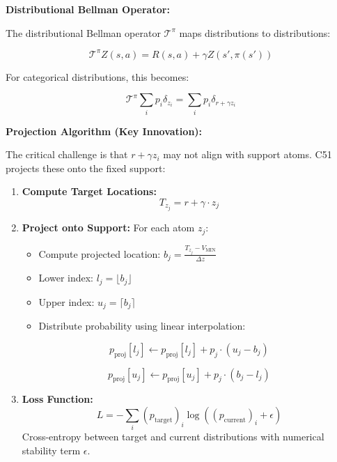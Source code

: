 \documentclass[12pt]{article}
\begin{document}
{{\textbf{Distributional Bellman Operator:}

The distributional Bellman operator $\mathcal{T}^\pi$ maps distributions to distributions:

\begin{equation}
\mathcal{T}^\pi Z(s,a) = R(s,a) + \gamma Z(s', \pi(s'))
\end{equation}

For categorical distributions, this becomes:

\begin{equation}
\mathcal{T}^\pi \sum_i p_i \delta_{z_i} = \sum_i p_i \delta_{r + \gamma z_i}
\end{equation}

\textbf{Projection Algorithm (Key Innovation):}

The critical challenge is that $r + \gamma z_i$ may not align with support atoms. C51 projects these onto the fixed support:

\begin{enumerate}
\item \textbf{Compute Target Locations:}
\begin{equation}
T_{z_j} = r + \gamma \cdot z_j
\end{equation}

\item \textbf{Project onto Support:}
For each atom $z_j$:
\begin{itemize}
\item Compute projected location: $b_j = \frac{T_{z_j} - V_{\text{MIN}}}{\Delta z}$
\item Lower index: $l_j = \lfloor b_j \rfloor$
\item Upper index: $u_j = \lceil b_j \rceil$
\item Distribute probability using linear interpolation:
\end{itemize}

\begin{equation}
p_{\text{proj}}[l_j] \leftarrow p_{\text{proj}}[l_j] + p_j \cdot (u_j - b_j)
\end{equation}

\begin{equation}
p_{\text{proj}}[u_j] \leftarrow p_{\text{proj}}[u_j] + p_j \cdot (b_j - l_j)
\end{equation}

\item \textbf{Loss Function:}
\begin{equation}
L = -\sum_i (p_{\text{target}})_i \log((p_{\text{current}})_i + \epsilon)
\end{equation}
Cross-entropy between target and current distributions with numerical stability term $\epsilon$.
\end{enumerate}

}}
\end{document}
